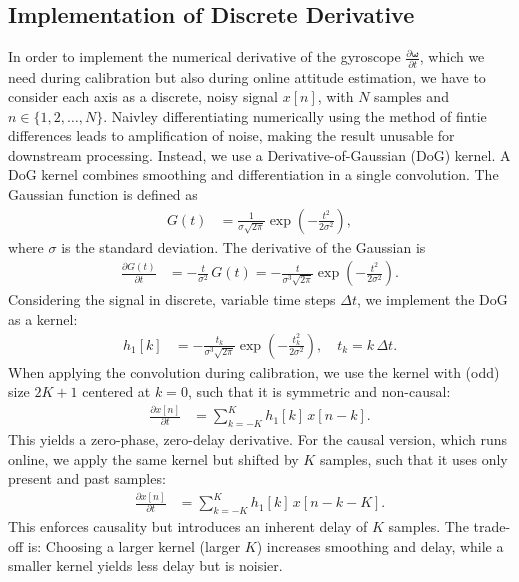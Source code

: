 \documentclass[journal]{IEEEtran}
\renewcommand{\vec}[1]{\boldsymbol{#1}}
\begin{document}
\subsection{Implementation of Discrete Derivative}
In order to implement the numerical derivative of the gyroscope $\frac{\partial \vec{\omega}}{\partial t}$, which we need during calibration but also during online attitude estimation, we have to consider each axis as a discrete, noisy signal $x[n]$, with $N$ samples and $n \in \lbrace 1,2, \dots, N \rbrace$.
Naivley differentiating numerically using the method of fintie differences leads to amplification of noise, making the result unusable for downstream processing.
Instead, we use a Derivative-of-Gaussian (DoG) kernel. 
A DoG kernel combines smoothing and differentiation in a single convolution.
The Gaussian function is defined as
\begin{align}
G(t) &= \frac{1}{\sigma \sqrt{2\pi}} \exp\!\left(-\frac{t^2}{2\sigma^2}\right),
\end{align}
where $\sigma$ is the standard deviation.
The derivative of the Gaussian is
\begin{align}
\frac{\partial G(t)}{\partial t} &= -\frac{t}{\sigma^2} \, G(t)
= -\frac{t}{\sigma^3 \sqrt{2\pi}} \exp\!\left(-\frac{t^2}{2\sigma^2}\right).
\end{align}
Considering the signal in discrete, variable time steps $\Delta t$, we implement the DoG as a kernel:  
\begin{align}
h_1[k] &= -\frac{t_k}{\sigma^3 \sqrt{2\pi}} 
\exp\!\left(-\frac{t_k^2}{2\sigma^2}\right),
\quad t_k = k \, \Delta t.
\end{align} 
When applying the convolution during calibration, we use the kernel with (odd) size $2K+1$ centered at $k=0$, such that it is symmetric and non-causal:
\begin{align}
\frac{\partial x[n]}{\partial t} &= \sum_{k=-K}^{K} h_1[k] \, x[n-k].\label{eq:kernelnoncausal}
\end{align}
This yields a zero-phase, zero-delay derivative.
For the causal version, which runs online, we apply the same kernel but shifted by $K$ samples, such that it uses only present and past samples:
\begin{align}
  \frac{\partial x[n]}{\partial t} &= \sum_{k=-K}^{K} h_1[k] \, x[n-k-K].
\end{align}
This enforces causality but introduces an inherent delay of $K$ samples. The trade-off is:
Choosing a larger kernel (larger $K$) increases smoothing and delay, while a smaller kernel yields less delay but is noisier.
\end{document}
